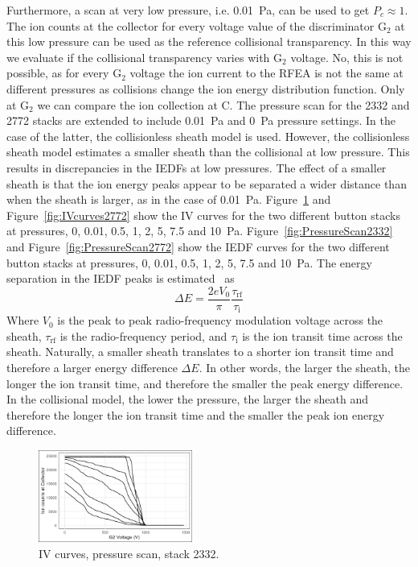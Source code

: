 Furthermore, a scan at very low pressure, i.e. 0.01~Pa, can be used to get $P_c \approx 1$. The ion counts at the collector for every voltage value of the discriminator G$_2$ at this low pressure can be used as the reference collisional transparency. In this way we evaluate if the collisional transparency varies with G$_2$ voltage. No, this is not possible, as for every G$_2$ voltage the ion current to the RFEA is not the same at different pressures as collisions change the ion energy distribution function. Only at G$_2$ we can compare the ion collection at C. The pressure scan for the 2332 and 2772 stacks are extended to include 0.01~Pa and 0~Pa pressure settings. In the case of the latter, the collisionless sheath model is used. However, the collisionless sheath model estimates a smaller sheath than the collisional at low pressure. This results in discrepancies in the IEDFs at low pressures. The effect of a smaller sheath is that the ion energy peaks appear to be separated a wider distance than when the sheath is larger, as in the case of 0.01~Pa. Figure~\ref{fig:IVcurves2332} and Figure~\ref{fig:IVcurves2772} show the IV curves for the two different button stacks at pressures, 0, 0.01, 0.5, 1, 2, 5, 7.5 and 10~Pa. Figure~\ref{fig:PressureScan2332} and Figure~\ref{fig:PressureScan2772} show the IEDF curves for the two different button stacks at pressures, 0, 0.01, 0.5, 1, 2, 5, 7.5 and 10~Pa. The energy separation in the IEDF peaks is estimated~\cite{Gahan2008} as 
\begin{equation}
\Delta E = \frac{2 e V_0}{ \pi } \frac{ \tau_\text{rf} }{ \tau_\text{i} }
\end{equation} 
Where $V_0$ is the peak to peak radio-frequency modulation voltage across the sheath, $\tau_\text{rf}$ is the radio-frequency period, and $\tau_\text{i}$ is the ion transit time across the sheath. Naturally, a smaller sheath translates to a shorter ion transit time and therefore a larger energy difference $\Delta E$. In other words, the larger the sheath, the longer the ion transit time, and therefore the smaller the peak energy difference. In the collisional model, the lower the pressure, the larger the sheath and therefore the longer the ion transit time and the smaller the peak ion energy difference.  

\begin{figure}[htbp]
\centering
\includegraphics[width=0.45\textwidth]{Figures/IVcurve2332.jpeg}
\caption{IV curves, pressure scan, stack 2332.}
\label{fig:IVcurves2332}
\end{figure}

